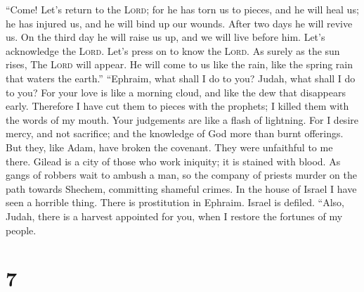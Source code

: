  ``Come! Let's return to the \textsc{Lord}; for he has
torn us to pieces, and he will heal us; he has injured us, and he will
bind up our wounds.  After two days he will revive us. On
the third day he will raise us up, and we will live before him.
 Let's acknowledge the \textsc{Lord}. Let's press on to
know the \textsc{Lord}. As surely as the sun rises, The \textsc{Lord}
will appear. He will come to us like the rain, like the spring rain that
waters the earth.''  ``Ephraim, what shall I do to you?
Judah, what shall I do to you? For your love is like a morning cloud,
and like the dew that disappears early.  Therefore I have
cut them to pieces with the prophets; I killed them with the words of my
mouth. Your judgements are like a flash of lightning.  For
I desire mercy, and not sacrifice; and the knowledge of God more than
burnt offerings.  But they, like Adam, have broken the
covenant. They were unfaithful to me there.  Gilead is a
city of those who work iniquity; it is stained with blood.
 As gangs of robbers wait to ambush a man, so the company
of priests murder on the path towards Shechem, committing shameful
crimes.  In the house of Israel I have seen a horrible
thing. There is prostitution in Ephraim. Israel is defiled.
 ``Also, Judah, there is a harvest appointed for you,
when I restore the fortunes of my people.

\hypertarget{section-6}{%
\section{7}\label{section-6}}

